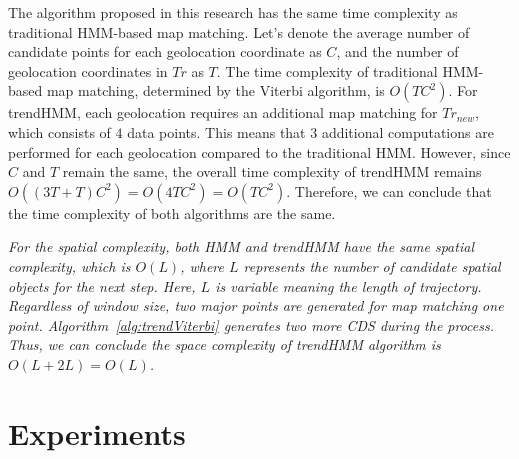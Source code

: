 \documentclass[preprint,12pt]{elsarticle}
\begin{document}
 
	The algorithm proposed in this research has the same time complexity as traditional HMM-based map matching. Let's denote the average number of candidate points for each geolocation coordinate as $C$, and the number of geolocation coordinates in $Tr$ as $T$. The time complexity of traditional HMM-based map matching, determined by the Viterbi algorithm, is $O(TC^2)$.
For trendHMM, each geolocation requires an additional map matching for $Tr_{new}$, which consists of $4$ data points. This means that $3$ additional computations are performed for each geolocation compared to the traditional HMM. However, since $C$ and $T$ remain the same, the overall time complexity of trendHMM remains $O((3T+T)C^2) = O(4TC^2) = O(TC^2)$.
Therefore, we can conclude that the time complexity of both algorithms are the same. 


\emph{For the spatial complexity, both HMM and trendHMM have the same spatial complexity, which is $O(L)$, where $L$ represents the number of candidate spatial objects for the next step.
	Here, $L$ is variable meaning the length of trajectory.
	Regardless of window size, two major points are generated for map matching one point.
	Algorithm~\ref{alg:trendViterbi} generates two more CDS during the process.
	Thus, we can conclude the space complexity of trendHMM algorithm is $O(L + 2L) = O(L)$.
}


\section{Experiments}
\label{sec:sec4}
\end{document}
